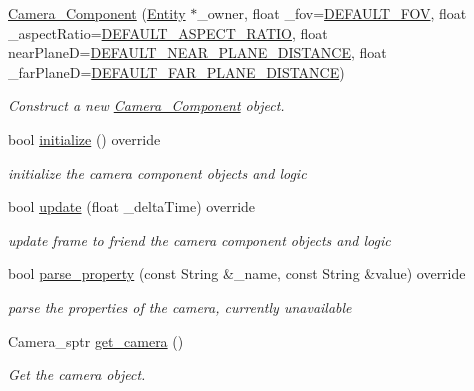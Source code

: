 \begin{DoxyCompactItemize}
\item 
\mbox{\hyperlink{classbanita_1_1_camera___component_a5fcebd13ad636d4973e257ac3b4d7e84}{Camera\+\_\+\+Component}} (\mbox{\hyperlink{classbanita_1_1_entity}{Entity}} $\ast$\+\_\+owner, float \+\_\+fov=\mbox{\hyperlink{_camera___component_8hpp_ab45bec6fad4f0c516372be64fcca1d73}{D\+E\+F\+A\+U\+L\+T\+\_\+\+F\+OV}}, float \+\_\+aspect\+Ratio=\mbox{\hyperlink{_camera___component_8hpp_a1417cf7e68d22784246127e2aee342de}{D\+E\+F\+A\+U\+L\+T\+\_\+\+A\+S\+P\+E\+C\+T\+\_\+\+R\+A\+T\+IO}}, float near\+PlaneD=\mbox{\hyperlink{_camera___component_8hpp_a643eaef95c75256d77bea146114eeb7c}{D\+E\+F\+A\+U\+L\+T\+\_\+\+N\+E\+A\+R\+\_\+\+P\+L\+A\+N\+E\+\_\+\+D\+I\+S\+T\+A\+N\+CE}}, float \+\_\+far\+PlaneD=\mbox{\hyperlink{_camera___component_8hpp_a55c2ae8ef286b359ae10964104b25836}{D\+E\+F\+A\+U\+L\+T\+\_\+\+F\+A\+R\+\_\+\+P\+L\+A\+N\+E\+\_\+\+D\+I\+S\+T\+A\+N\+CE}})
\begin{DoxyCompactList}\small\item\em Construct a new \mbox{\hyperlink{classbanita_1_1_camera___component}{Camera\+\_\+\+Component}} object. \end{DoxyCompactList}\item 
bool \mbox{\hyperlink{classbanita_1_1_camera___component_a5cf5d281063a61d5c11914d30c512f40}{initialize}} () override
\begin{DoxyCompactList}\small\item\em initialize the camera component objects and logic \end{DoxyCompactList}\item 
bool \mbox{\hyperlink{classbanita_1_1_camera___component_a177f9d18f146b83d6dc08eab3c576cae}{update}} (float \+\_\+delta\+Time) override
\begin{DoxyCompactList}\small\item\em update frame to friend the camera component objects and logic \end{DoxyCompactList}\item 
bool \mbox{\hyperlink{classbanita_1_1_camera___component_a1f494aa6cd8edcbe61866dc5e053c6be}{parse\+\_\+property}} (const String \&\+\_\+name, const String \&value) override
\begin{DoxyCompactList}\small\item\em parse the properties of the camera, currently unavailable \end{DoxyCompactList}\item 
Camera\+\_\+sptr \mbox{\hyperlink{classbanita_1_1_camera___component_aa29ffc5af9f30bea479dada4bf588726}{get\+\_\+camera}} ()
\begin{DoxyCompactList}\small\item\em Get the camera object. \end{DoxyCompactList}\end{DoxyCompactItemize}
